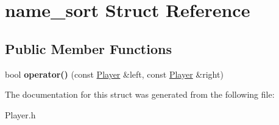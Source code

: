 \hypertarget{structname__sort}{}\section{name\+\_\+sort Struct Reference}
\label{structname__sort}
\subsection*{Public Member Functions}
\begin{DoxyCompactItemize}
\item 
\hypertarget{structname__sort_aac254d899386ba4744f885170f6b128a}{}\label{structname__sort_aac254d899386ba4744f885170f6b128a} 
bool {\bfseries operator()} (const \hyperlink{struct_player}{Player} \&left, const \hyperlink{struct_player}{Player} \&right)
\end{DoxyCompactItemize}


The documentation for this struct was generated from the following file\+:\begin{DoxyCompactItemize}
\item 
Player.\+h\end{DoxyCompactItemize}
